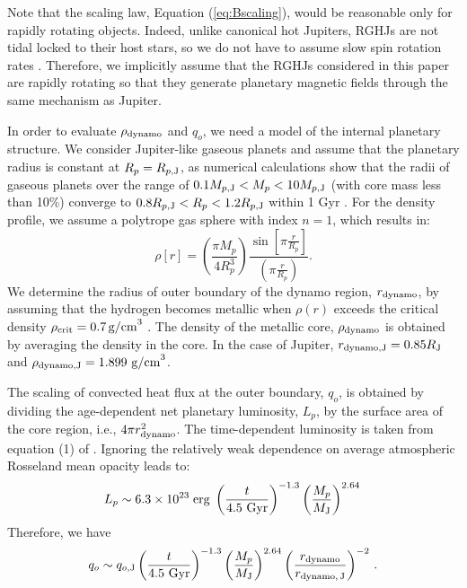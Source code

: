 \documentclass[iop,numberedappendix,apj,twocolappendix,]{emulateapj}
\def\revise#1{\color{blue}{\bf #1} \color{black}}
\begin{document}
Note that the scaling law, Equation (\ref{eq:Bscaling}), would be reasonable only for rapidly rotating objects.
Indeed, unlike canonical hot Jupiters, RGHJs are not tidal locked to their host stars, so we do not have to assume slow spin rotation rates \citep{spiegel+madhusudhan2012}.
Therefore, we implicitly assume that the RGHJs considered in this paper are rapidly rotating so that they generate planetary magnetic fields through the same mechanism as Jupiter. 


In order to evaluate $\rho _{\rm dynamo}$ and $q_o$, we need a model of the internal planetary structure. 
We consider Jupiter-like gaseous planets and assume that the planetary radius is constant at $R_p = R_{p,{\rm J}}$, as numerical calculations show that the radii of gaseous planets over the range of $0.1 M_{p,{\rm J}} < M_p < 10M_{p, {\rm J}}$ (with core mass less than 10\%) converge to $0.8 R_{p,{\rm J}} < R_p < 1.2R_{p, {\rm J}}$ within 1 Gyr \citep{fortney2007}. 
For the density profile, we \revise{follow \citet{griesmeier2007b} and} assume a polytrope gas sphere with index $n=1$, which results in:
\begin{equation}
\rho [r] = \left( \frac{\pi M_p}{4 R_p^3} \right) \frac{\sin \left[ \pi \frac{r}{R_p} \right]}{\left( \pi \frac{r}{R_p} \right)}. \label{eq:rho_r}
\end{equation}
We determine the radius of outer boundary of the dynamo region, $r_{\rm dynamo}$, by assuming that the hydrogen becomes metallic when $\rho (r)$ exceeds the critical density $\rho_{\rm crit}=0.7\,\mbox{g/cm}^3$ \citep{exoplanets2006, griesmeier2007b}.
The density of the metallic core, $\rho _{\rm dynamo}$ is obtained by averaging the density in the core. 
In the case of Jupiter, $r_{\rm dynamo, J} = 0.85 R_{\rm J}$ and $\rho_{\rm dynamo, J} = 1.899~{\rm g/cm}^3$.

The scaling of convected heat flux at the outer boundary, $q_o$, is obtained by dividing the age-dependent net planetary luminosity, $L_p$, by the surface area of the core region, i.e., $4\pi r_{\rm dynamo}^2$. 
The time-dependent luminosity is taken from equation (1) of \citet{burrows_et_al2001} \citep[see also][]{marley2007}. 
Ignoring the relatively weak dependence on average atmospheric Rosseland mean opacity leads to:
\begin{equation}	
L_p \sim 6.3\times10^{23} \; {\rm erg} \; \left( \frac{t}{4.5 \rm~Gyr} \right)^{-1.3} \left( \frac{M_p}{M_{\rm J}} \right)^{2.64} \, 
\label{eq:burrowsLum}
\end{equation}
Therefore, we have
\begin{equation}
q_o \sim q_{o, {\rm J}} \left( \frac{t}{4.5 \rm~Gyr} \right)^{-1.3} \left( \frac{M_p}{M_{\rm J}} \right)^{2.64} \left( \frac{r_{\rm dynamo}}{r_{\rm dynamo,\,J}} \right)^{-2}\, .
\label{eq:burrowsHeatFlux}
\end{equation}
\end{document}
